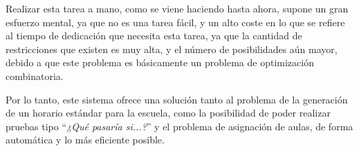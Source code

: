 
Realizar esta tarea a mano, como se viene haciendo hasta ahora, supone un gran esfuerzo mental, ya que no es una tarea fácil, y un alto coste en lo que se refiere al tiempo de dedicación que necesita esta tarea, ya que la cantidad de restricciones que existen es muy alta, y el número de posibilidades aún mayor, debido a que este problema es básicamente un problema de optimización combinatoria.

Por lo tanto, este sistema ofrece una solución tanto al problema de la generación de un horario estándar para la escuela, como la posibilidad de poder realizar pruebas tipo ``\textit{¿Qué pasaría si...?}'' y el problema de asignación de aulas, de forma automática y lo más eficiente posible.




    
